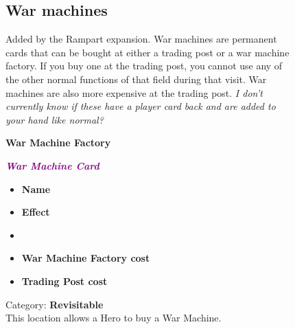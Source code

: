 \begin{figure}[h]
  \begin{minipage}[t]{0.5\textwidth}
    \vspace{0pt}
    \subsection*{War machines}
    Added by the Rampart expansion.
    War machines are permanent cards that can be bought at either a trading post or a war machine factory.
    If you buy one at the trading post, you cannot use any of the other normal functions of that field during that visit.
    War machines are also more expensive at the trading post.
    \textit{I don't currently know if these have a player card back and are added to your hand like normal?}\par
    \smallskip
    \raggedright\textbf{War Machine Factory}
      \caption{\scriptsize Category: \scriptsize\textbf{Revisitable}\\This location allows a Hero to buy a War Machine.}
  \end{minipage}
  \begin{minipage}[t]{0.4\textwidth}
    \vspace{0pt}
    \centering
    \begin{scriptsize}
    \end{scriptsize}
    \break
    \footnotesize{\textbf{\textit{\textcolor{purple}{War Machine Card}}}}
    \scriptsize
    \begin{multicols}{2}
      \begin{itemize}
        \item[\textbf{1.}] \textbf{Name}
        \item[\textbf{2.}] \textbf{Effect}
        \item[\textbf{\phantom{.}}] \phantom{.}
        \item[\textbf{3.}] \textbf{War Machine Factory cost}
        \item[\textbf{4.}] \textbf{Trading Post cost}
      \end{itemize}
    \end{multicols}
  \end{minipage}
\end{figure}

